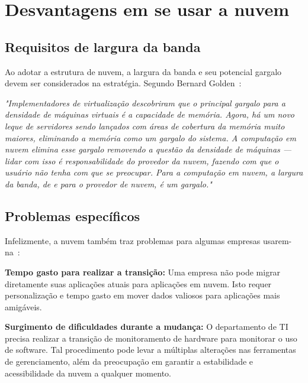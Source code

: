 \section{Desvantagens em se usar a nuvem}

\subsection{Requisitos de largura da banda}

Ao adotar a estrutura de nuvem, a largura da banda e seu potencial gargalo devem ser 
considerados na estratégia. Segundo Bernard 
Golden~\cite{cio-cloud-computing-bottleneck}:

\begin{displayquote}
\emph{
    "Implementadores de virtualização descobriram que o principal gargalo para a 
    densidade de máquinas virtuais é a capacidade de memória. Agora, há um novo
    leque de servidores sendo lançados com áreas de cobertura da memória muito
    maiores, eliminando a memória como um gargalo do sistema. A computação em nuvem
    elimina esse gargalo removendo a questão da densidade de máquinas --- lidar com
    isso é responsabilidade do provedor da nuvem, fazendo com que o usuário não tenha
    com que se preocupar.
    Para a computação em nuvem, a largura da banda, de e para o provedor de nuvem,
    é um gargalo."
}
\end{displayquote}

\subsection{Problemas específicos}

Infelizmente, a nuvem também traz problemas para algumas empresas 
usarem-na~\cite{webhostblog-reasons-not-to-use-cloud}:

\newcommand{\itemm}[1]{\item\textbf{#1}}

\begin{itemise}

    \itemm{Tempo gasto para realizar a transição:} Uma empresa não pode migrar
    diretamente suas aplicações atuais para aplicações em nuvem. Isto requer
    personalização e tempo gasto em mover dados valiosos para aplicações mais
    amigáveis.

    \itemm{Surgimento de dificuldades durante a mudança:} O departamento de TI 
    precisa realizar a transição de monitoramento de hardware para monitorar o uso 
    de software. Tal procedimento pode levar a múltiplas alterações nas ferramentas 
    de gerenciamento, além da preocupação em garantir a estabilidade e 
    acessibilidade da nuvem a qualquer momento.

\end{itemise}

\undef\itemm
